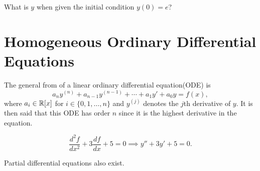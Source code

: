 \begin{question}
    What is $y$ when given the initial condition $y(0)=e$?
\end{question}

\section{Homogeneous Ordinary Differential Equations}
The general from of a linear ordinary differential equation(ODE) is
$$a_ny^{(n)} +a_{n-1}y^{(n-1)}+\cdots+a_1y'+a_0y = f(x),$$
where $a_i \in \mathbb R[x]$ for $i \in \{0, 1, \dots, n\}$ and $y^{(j)}$ denotes
the $j$th derivative of $y$. It is then said that this ODE
has \alert{order} $n$ since it is the highest derivative in the equation.
\begin{example}[ODE]
    $$\frac{d^2f}{dx^2} + 3 \frac{df}{dx} + 5 = 0  \implies y''+3y'+5=0.$$
\end{example}
\begin{remark}
    Partial differential equations also exist.
\end{remark}


